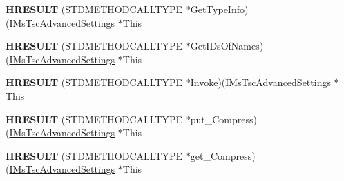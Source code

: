 \begin{DoxyCompactItemize}
\item 
\mbox{\label{struct_m_s_t_s_c_lib_1_1_i_ms_tsc_advanced_settings_vtbl_ab2648643c43fd2d02ca642e3b282edd8}} 
{\bfseries H\+R\+E\+S\+U\+LT} (S\+T\+D\+M\+E\+T\+H\+O\+D\+C\+A\+L\+L\+T\+Y\+PE $\ast$Get\+Type\+Info)(\hyperlink{interface_m_s_t_s_c_lib_1_1_i_ms_tsc_advanced_settings}{I\+Ms\+Tsc\+Advanced\+Settings} $\ast$This
\item 
\mbox{\label{struct_m_s_t_s_c_lib_1_1_i_ms_tsc_advanced_settings_vtbl_add2bd94a79d24b75e6e631f64ec00f7e}} 
{\bfseries H\+R\+E\+S\+U\+LT} (S\+T\+D\+M\+E\+T\+H\+O\+D\+C\+A\+L\+L\+T\+Y\+PE $\ast$Get\+I\+Ds\+Of\+Names)(\hyperlink{interface_m_s_t_s_c_lib_1_1_i_ms_tsc_advanced_settings}{I\+Ms\+Tsc\+Advanced\+Settings} $\ast$This
\item 
\mbox{\label{struct_m_s_t_s_c_lib_1_1_i_ms_tsc_advanced_settings_vtbl_a851e34c4053141e895f49876adeef94d}} 
{\bfseries H\+R\+E\+S\+U\+LT} (S\+T\+D\+M\+E\+T\+H\+O\+D\+C\+A\+L\+L\+T\+Y\+PE $\ast$Invoke)(\hyperlink{interface_m_s_t_s_c_lib_1_1_i_ms_tsc_advanced_settings}{I\+Ms\+Tsc\+Advanced\+Settings} $\ast$This
\item 
\mbox{\label{struct_m_s_t_s_c_lib_1_1_i_ms_tsc_advanced_settings_vtbl_a403769cb2dcc6aaefa2aced257584b5d}} 
{\bfseries H\+R\+E\+S\+U\+LT} (S\+T\+D\+M\+E\+T\+H\+O\+D\+C\+A\+L\+L\+T\+Y\+PE $\ast$put\+\_\+\+Compress)(\hyperlink{interface_m_s_t_s_c_lib_1_1_i_ms_tsc_advanced_settings}{I\+Ms\+Tsc\+Advanced\+Settings} $\ast$This
\item 
\mbox{\label{struct_m_s_t_s_c_lib_1_1_i_ms_tsc_advanced_settings_vtbl_aa2917e9a6d31b4fe0f7c0a4115a68007}} 
{\bfseries H\+R\+E\+S\+U\+LT} (S\+T\+D\+M\+E\+T\+H\+O\+D\+C\+A\+L\+L\+T\+Y\+PE $\ast$get\+\_\+\+Compress)(\hyperlink{interface_m_s_t_s_c_lib_1_1_i_ms_tsc_advanced_settings}{I\+Ms\+Tsc\+Advanced\+Settings} $\ast$This
\item 
\mbox{\label{struct_m_s_t_s_c_lib_1_1_i_ms_tsc_advanced_settings_vtbl_ad6a599440824dd9bc74ebd945f6c94c3}} 

\end{DoxyCompactItemize}
